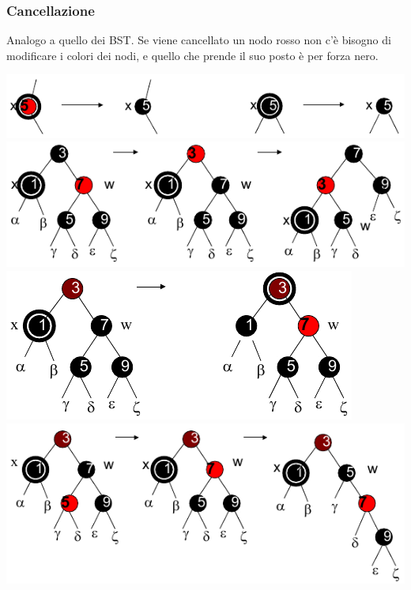 \documentclass[10pt,a4paper]{article}
\begin{document}
\begin{multicols*}{2}
\subsubsection*{Cancellazione}
Analogo a quello dei BST. Se viene cancellato un nodo rosso non c'è bisogno di modificare i colori dei nodi, e quello che prende il suo posto è per forza nero.

\centering
\vspace{1em}
\includegraphics[width=\linewidth, scale=0.9]{rb_delete_fixup_0.png}
\vspace{1em}
\includegraphics[width=\linewidth, scale=0.9]{rb_delete_fixup_1.png}
\vspace{1em}
\includegraphics[width=\linewidth, scale=0.9]{rb_delete_fixup_2.png}
\vspace{1em}
\includegraphics[width=\linewidth, scale=0.9]{rb_delete_fixup_3.png}

\end{multicols*}
\end{document}
